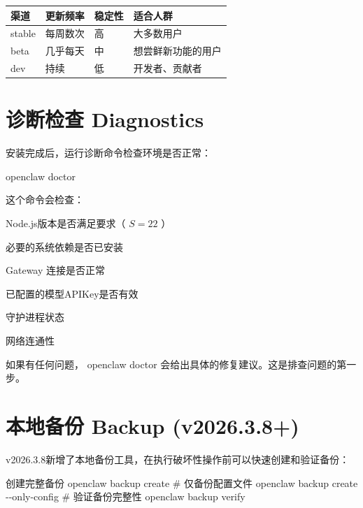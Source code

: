 \documentclass[
  10
]{article}
\newenvironment{Shaded}{}{}
\newcommand{\NormalTok}[1]{#1}
\newcounter{none} %
\begin{document}
{\def\LTcaptype{none} %
\begin{longtable}[]{@{}|l|l|l|l|@{}}
\toprule\noalign{}
\endhead
\bottomrule\noalign{}
\endlastfoot
\hline
渠道 & 更新频率 & 稳定性 & 适合人群 \\
\hline
stable & 每周数次 & 高 & 大多数用户 \\
\hline
beta & 几乎每天 & 中 & 想尝鲜新功能的用户 \\
\hline
dev & 持续 & 低 & 开发者、贡献者 \\
\hline
\end{longtable}
}

\section{诊断检查
Diagnostics}\label{ux8bcaux65adux68c0ux67e5-diagnostics}

安装完成后，运行诊断命令检查环境是否正常：

\begin{Shaded}
\begin{Highlighting}[]
\NormalTok{openclaw doctor}
\end{Highlighting}
\end{Shaded}

这个命令会检查：

Node.js版本是否满足要求（ \(S = 2 2\) ）

必要的系统依赖是否已安装

Gateway 连接是否正常

已配置的模型APIKey是否有效

守护进程状态

网络连通性

如果有任何问题， openclaw doctor
会给出具体的修复建议。这是排查问题的第一步。

\section{本地备份 Backup
(v2026.3.8+)}\label{ux672cux5730ux5907ux4efd-backup-v2026.3.8}

v2026.3.8新增了本地备份工具，在执行破坏性操作前可以快速创建和验证备份：

\begin{Shaded}
\begin{Highlighting}[]
\NormalTok{创建完整备份  }
\NormalTok{openclaw backup create  }
\NormalTok{\# 仅备份配置文件  }
\NormalTok{openclaw backup create {-}{-}only{-}config  }
\NormalTok{\# 验证备份完整性  }
\NormalTok{openclaw backup verify}
\end{Highlighting}
\end{Shaded}
\end{document}
